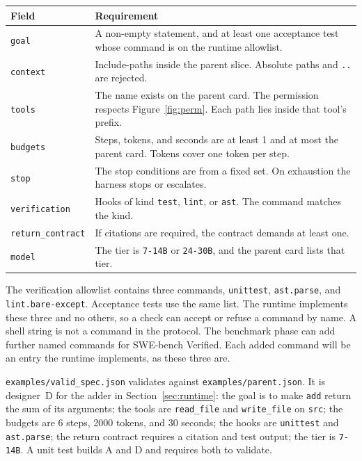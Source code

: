 \documentclass[10pt,a4paper]{article}
\begin{document}
\begin{table}[H]
\centering
\small
\begin{tabularx}{\textwidth}{@{}lY@{}}
\toprule
Field & Requirement \\
\midrule
\texttt{goal} & A non-empty statement, and at least one acceptance test whose command is on the runtime allowlist. \\
\texttt{context} & Include-paths inside the parent slice. Absolute paths and \texttt{..} are rejected. \\
\texttt{tools} & The name exists on the parent card. The permission respects Figure~\ref{fig:perm}. Each path lies inside that tool's prefix. \\
\texttt{budgets} & Steps, tokens, and seconds are at least 1 and at most the parent card. Tokens cover one token per step. \\
\texttt{stop} & The stop conditions are from a fixed set. On exhaustion the harness stops or escalates. \\
\texttt{verification} & Hooks of kind \texttt{test}, \texttt{lint}, or \texttt{ast}. The command matches the kind. \\
\texttt{return\_contract} & If citations are required, the contract demands at least one. \\
\texttt{model} & The tier is \texttt{7-14B} or \texttt{24-30B}, and the parent card lists that tier. \\
\bottomrule
\end{tabularx}
\end{table}

The verification allowlist contains three commands, \texttt{unittest}, \texttt{ast.parse}, and \texttt{lint.bare-except}. Acceptance tests use the same list. The runtime implements these three and no others, so a check can accept or refuse a command by name. A shell string is not a command in the protocol. The benchmark phase can add further named commands for SWE-bench Verified. Each added command will be an entry the runtime implements, as these three are.

\texttt{examples/valid\_spec.json} validates against \texttt{examples/parent.json}. It is designer~D for the adder in Section~\ref{sec:runtime}: the goal is to make \texttt{add} return the sum of its arguments; the tools are \texttt{read\_file} and \texttt{write\_file} on \texttt{src}; the budgets are 6 steps, 2000 tokens, and 30 seconds; the hooks are \texttt{unittest} and \texttt{ast.parse}; the return contract requires a citation and test output; the tier is \texttt{7-14B}. A unit test builds A and D and requires both to validate.
\end{document}
